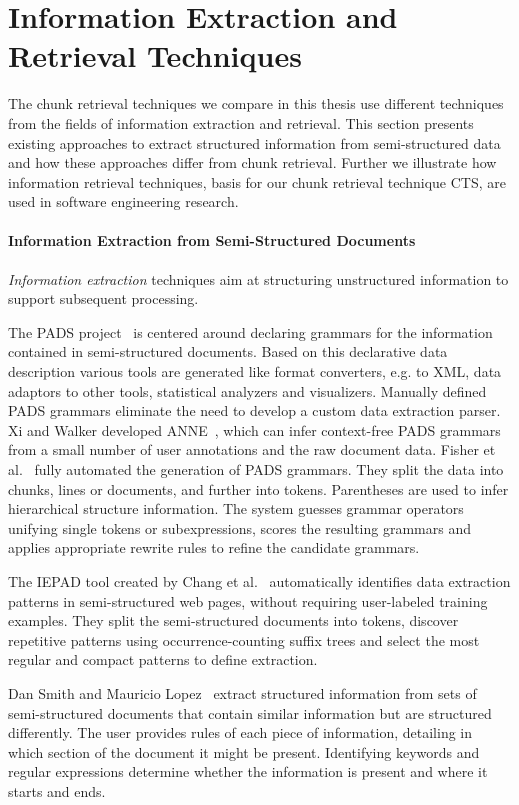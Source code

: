 \documentclass[\myrootdir/main.tex]{subfiles}
\begin{document}
\section{Information Extraction and Retrieval Techniques}

The chunk retrieval techniques we compare in this thesis use different techniques from the fields of information extraction and retrieval.
This section presents existing approaches to extract structured information from semi-structured data and how these approaches differ from chunk retrieval.
Further we illustrate how information retrieval techniques, basis for our chunk retrieval technique CTS, are used in software engineering research.

\paragraph{Information Extraction from Semi-Structured Documents}
\emph{Information extraction} techniques aim at structuring unstructured information to support subsequent processing.

The PADS project~\cite{fisher2011the-pads} is centered around declaring grammars for the information contained in semi-structured documents.
Based on this declarative data description various tools are generated like format converters, e.g. to XML, data adaptors to other tools, statistical analyzers and visualizers.
Manually defined PADS grammars eliminate the need to develop a custom data extraction parser.
Xi and Walker developed ANNE~\cite{xi2010a-context-free}, which can infer context-free PADS grammars from a small number of user annotations and the raw document data.
Fisher et al.~\cite{fisher2008from} fully automated the generation of PADS grammars.
They split the data into chunks, lines or documents, and further into tokens.
Parentheses are used to infer hierarchical structure information.
The system guesses grammar operators unifying single tokens or subexpressions, scores the resulting grammars and applies appropriate rewrite rules to refine the candidate grammars.

The IEPAD tool created by Chang et al.~\cite{chang2003automatic} automatically identifies data extraction patterns in semi-structured web pages, without requiring user-labeled training examples.
They split the semi-structured documents into tokens, discover repetitive patterns using occurrence-counting suffix trees and select the most regular and compact patterns to define extraction.

Dan Smith and Mauricio Lopez~\cite{smith1997information} extract structured information from sets of semi-structured documents that contain similar information but are structured differently.
The user provides rules of each piece of information, detailing in which section of the document it might be present.
Identifying keywords and regular expressions determine whether the information is present and where it starts and ends.
\end{document}

